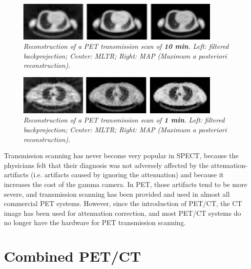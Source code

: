 \documentclass[11pt,oneside]{book}
\begin{document}
\begin{figure}[tb]
\centering
\includegraphics[width=0.9\textwidth]{figs/fig_pettranslang.pdf}
\caption{\label{fig:pettranslang} \emph{Reconstruction of a PET transmission
scan of {\bf 10 min}. Left: filtered backprojection; Center: MLTR; Right: MAP
(Maximum a posteriori reconstruction).}}
\end{figure}

\begin{figure}[tb]
\centering
\includegraphics[width=0.9\textwidth]{figs/fig_pettranskort.pdf}
\caption{\label{fig:pettranskort} \emph{Reconstruction of a PET transmission
scan of {\bf 1 min}. Left: filtered backprojection; Center: MLTR; Right: MAP
(Maximum a posteriori reconstruction).}}
\end{figure}

Transmission scanning has never become very popular in SPECT, because
the physicians felt that their diagnosis was not adversely affected by
the attenuation-artifacts (i.e. artifacts caused by ignoring the
attenuation) and because it increases the cost of the gamma camera. In
PET, those artifacts tend to be more severe, and transmission scanning
has been provided and used in almost all commercial PET
systems. However, since the introduction of PET/CT, the CT image has
been used for attenuation correction, and most PET/CT systems do no
longer have the hardware for PET transmission scanning.

\section{Combined PET/CT}
\end{document}
